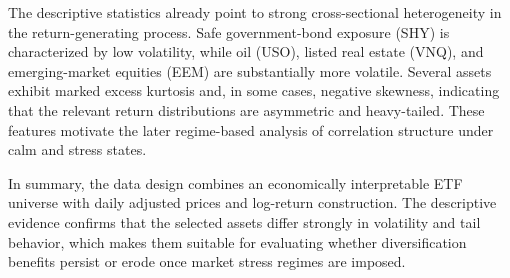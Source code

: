 The descriptive statistics already point to strong cross-sectional heterogeneity in the return-generating process. Safe government-bond exposure (SHY) is characterized by low volatility, while oil (USO), listed real estate (VNQ), and emerging-market equities (EEM) are substantially more volatile. Several assets exhibit marked excess kurtosis and, in some cases, negative skewness, indicating that the relevant return distributions are asymmetric and heavy-tailed. These features motivate the later regime-based analysis of correlation structure under calm and stress states.

In summary, the data design combines an economically interpretable ETF universe with daily adjusted prices and log-return construction. The descriptive evidence confirms that the selected assets differ strongly in volatility and tail behavior, which makes them suitable for evaluating whether diversification benefits persist or erode once market stress regimes are imposed.
